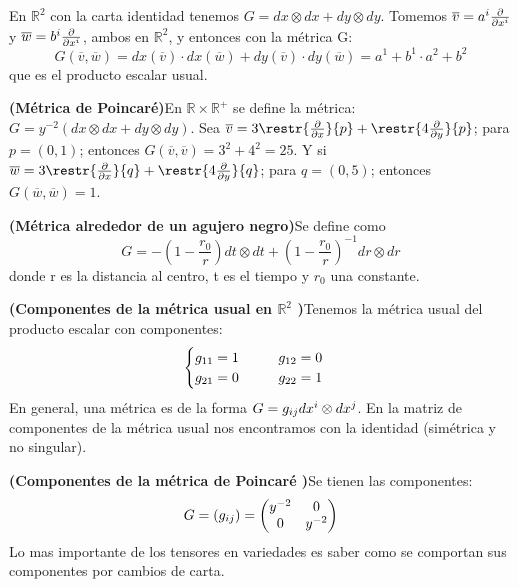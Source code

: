 \documentclass[palatino, bibnumbers]{apuntes}
\begin{document}
\begin{example}En $ℝ^{2}$ con la carta identidad tenemos $G=dx\otimes dx+dy\otimes dy$. Tomemos $\overline{v}=a^i\pdv{}{x^i}$ y $\overline{w}=b^i\pdv{}{x^i}$, ambos en $ℝ^{2}$, y entonces con la métrica G: $$G(\overline{v},\overline{w})=dx(\overline{v})\cdot dx(\overline{w})+dy(\overline{v})\cdot dy(\overline{w})=a^1+b^1\cdot a^2+b^2$$ que es el producto escalar usual.
\end{example}
\begin{example}\textbf{(Métrica de Poincaré)}\indent En $ℝ×ℝ^+$ se define la métrica:\space$G=y^{-2}(dx\otimes dx+dy\otimes dy)$. Sea $\overline{v}=3\restr{\pdv{}{x}}{p}+\restr{4\pdv{}{y}}{p}$; para $p=(0,1)$; entonces $G(\overline{v},\overline{v})=3^2+4^2=25$. Y si $\overline{w}=3\restr{\pdv{}{x}}{q}+\restr{4\pdv{}{y}}{q}$; para $q=(0,5)$; entonces $G(\overline{w},\overline{w})=1$.
\end{example}
\begin{example}\textbf{(Métrica alrededor de un agujero negro)}\indent Se define como $$G=-\left(1-\frac{r_0}{r}\right)dt\otimes dt+\left(1-\frac{r_0}{r}\right)^{-1}dr\otimes dr$$ donde r es la distancia al centro, t es el tiempo y $r_0$ una constante.
\end{example}
\newpage
\begin{example}\textbf{(Componentes de la métrica usual en $ℝ^2$ )}\indent Tenemos la métrica usual del producto escalar con componentes: $$\begin{cases}
	g_{1\space1}=1 \hspace*{1cm} g_{1\space2}=0\\
	g_{2\space1}=0 \hspace*{1cm} g_{2\space2}=1\\
	\end{cases}$$
	En general, una métrica es de la forma $G=g_{i\space j}dx^i\otimes dx^j$. En la matriz de componentes de la métrica usual nos encontramos con la identidad (simétrica y no singular).
\end{example}

\begin{example}\textbf{(Componentes de la métrica de Poincaré )}\indent Se tienen las componentes:$$G=(g_{i\space j})=\begin{pmatrix}y^{-2}&0\\0&y^{-2}\\ \end{pmatrix}$$ Lo mas importante de los tensores en variedades es saber como se comportan sus componentes por cambios de carta.
\end{example}
\end{document}
